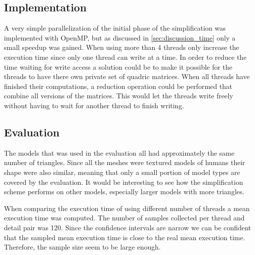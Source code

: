 \subsection{Implementation}
A very simple parallelization of the initial phase of the simplification was implemented with OpenMP, but as discussed in \cref{sec:discussion_time} only a small speedup was gained. When using more than 4 threads only increase the execution time since only one thread can write at a time. In order to reduce the time waiting for write access a solution could be to make it possible for the threads to have there own private set of quadric matrices. When all threads have finished their computations, a reduction operation could be performed that combine all versions of the matrices. This would let the threads write freely without having to wait for another thread to finish writing.



\subsection{Evaluation}
The models that was used in the evaluation all had approximately the same number of triangles. Since all the meshes were textured models of humans their shape were also similar, meaning that only a small portion of model types are covered by the evaluation. It would be interesting to see how the simplification scheme performs on other models, especially larger models with more triangles.

When comparing the execution time of using different number of threads a mean execution time was computed. The number of samples collected per thread and detail pair was 120. Since the confidence intervals are narrow we can be confident that the sampled mean execution time is close to the real mean execution time. Therefore, the sample size seem to be large enough. 
  


